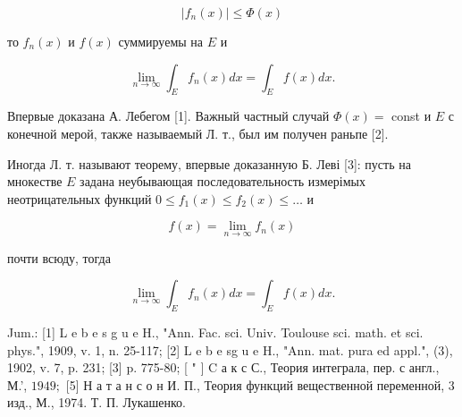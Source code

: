 \documentclass[10pt]{article}
\begin{document}
\[

\left|f_{n}(x)\right| \leqslant \Phi(x)

\]



то $f_{n}(x)$ и $f(x)$ суммируемы на $E$ и



\[

\lim _{n \rightarrow \infty} \int_{E} f_{n}(x) d x=\int_{E} f(x) d x .

\]



Впервые доказана А. Лебегом [1]. Важный частный случай $\Phi(x)=$ const и $E$ с конечной мерой, также называемый Л. т., был им получен раньпе [2].



Иногда Л. т. называют теорему, впервые доказанную Б. Леві [3]: пусть на мнокестве $E$ задана неубывающая последовательность измерімых неотрицательных функций $0 \leqslant f_{1}(x) \leqslant f_{2}(x) \leqslant \ldots$ и



\[

f(x)=\lim _{n \rightarrow \infty} f_{n}(x)

\]



почти всюду, тогда



\[

\lim _{n \rightarrow \infty} \int_{E} f_{n}(x) d x=\int_{E} f(x) d x .

\]



Jum.: [1] L e b e s g u e H., "Ann. Fac. sci. Univ. Toulouse sci. math. et sci. phys.", 1909, v. 1, n. 25-117; [2] L e b e sg u e H., "Ann. mat. pura ed appl.", (3), 1902, v. 7, p. 231; [3] p. 775-80; [ " $]$ C а к с С., Теория интеграла, пер. с англ., М.', $1949 ;$ [5] Н а т а н с о н И. П., Теория функций вещественной переменной, 3 изд., М., 1974. Т. П. Лукашенко.
\end{document}
